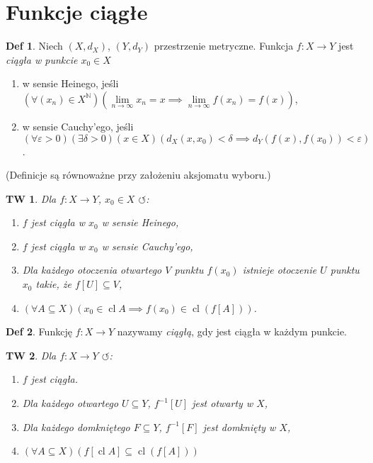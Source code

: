 \documentclass[a4paper, 12pt]{mwart}
\DeclareMathOperator{\cl}{cl}
\theoremstyle{definition}
\newtheorem{definicja}{Def}[section]
\theoremstyle{plain}
\newtheorem{twierdzenie}{TW}[section]
\theoremstyle{remark}
\begin{document}
\section{Funkcje ciągłe}
\begin{definicja}
	Niech $(X, d_X)$, $(Y, d_Y)$ \ppauza przestrzenie metryczne. Funkcja $f\colon X \to Y$ jest \emph{ciągła w punkcie $x_0 \in X$}
	\begin{enumerate}
		\item w sensie Heinego, jeśli $\left(\forall (x_n) \in X^\mathbb{N}\right)\left(\lim\limits_{n \to \infty} x_n = x \implies \lim\limits_{n \to \infty} f(x_n) = f(x)\right)$,
		\item w sensie Cauchy'ego, jeśli $\left(\forall \varepsilon > 0\right)\left(\exists \delta > 0\right)\left(x \in X\right)\left(d_X(x, x_0) < \delta \implies d_Y(f(x), f(x_0)) < \varepsilon\right)$.
	\end{enumerate}
	(Definicje są równoważne przy założeniu aksjomatu wyboru.)
\end{definicja}
\begin{twierdzenie}
	Dla $f\colon X \to Y$, $x_0 \in X$ $\circlearrowleft$:
	\begin{enumerate}
		\item $f$ jest ciągła w $x_0$ w sensie Heinego,
		\item $f$ jest ciągła w $x_0$ w sensie Cauchy'ego,
		\item Dla każdego otoczenia otwartego $V$ punktu $f(x_0)$ istnieje otoczenie $U$ punktu $x_0$ takie, że $f[U] \subseteq V$,
		\item $\left(\forall A \subseteq X\right)\left(x_0 \in \cl A \implies f(x_0) \in \cl \left(f[A]\right)\right)$.
	\end{enumerate}
\end{twierdzenie}
\begin{definicja}
	Funkcję $f\colon X \to Y$ nazywamy \emph{ciągłą}, gdy jest ciągła w każdym punkcie.
\end{definicja}
\begin{twierdzenie}
	Dla $f\colon X \to Y$ $\circlearrowleft$:
	\begin{enumerate}
		\item $f$ jest ciągła.
		\item Dla każdego otwartego $U \subseteq Y$, $f^{-1}[U]$ jest otwarty w $X$,		\item Dla każdego domkniętego $F \subseteq Y$, $f^{-1}[F]$ jest domknięty w $X$,
		\item $\left(\forall A \subseteq X\right)\left(f[\cl A] \subseteq \cl (f[A])\right)$
	\end{enumerate}
\end{twierdzenie}
\end{document}
